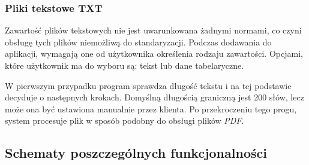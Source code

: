 \documentclass[12pt,a4paper,twoside]{article}
\begin{document}
\subsubsection*{Pliki tekstowe TXT}
Zawartość plików tekstowych nie jest uwarunkowana żadnymi normami, co czyni obsługę tych plików niemożliwą do standaryzacji. Podczas dodawania do aplikacji, wymagają one od użytkownika określenia rodzaju zawartości. Opcjami, które użytkownik ma do wyboru są: tekst lub dane tabelaryczne.\par
W pierwszym przypadku program sprawdza długość tekstu i na tej podstawie decyduje o następnych krokach. Domyślną długością graniczną jest 200 słów, lecz może ona być ustawiona manualnie przez klienta. Po przekroczeniu tego progu, system procesuje plik w sposób podobny do obsługi plików \textit{PDF}.\par
\subsection{Schematy poszczególnych funkcjonalności}
\end{document}
